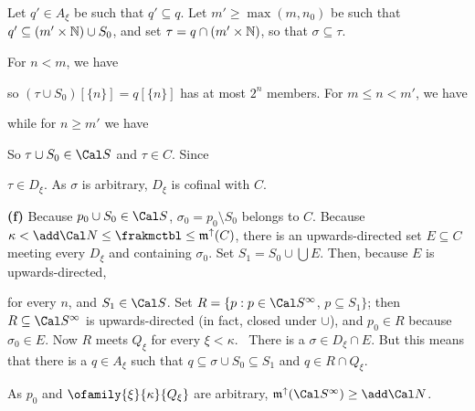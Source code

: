 {

\noindent Let $q'\in A_{\xi}$ be such that $q'\subseteq q$.   Let
$m'\ge\max(m,n_0)$ be such that $q'\subseteq(m'\times\Bbb N)\cup S_0$,
and set $\tau=q\cap(m'\times\Bbb N)$, so that $\sigma\subseteq\tau$.

For $n<m$, we have


\noindent so $(\tau\cup S_0)[\{n\}]=q[\{n\}]$ has at most $2^n$ members.
For $m\le n<m'$, we have


\noindent while for $n\ge m'$ we have


\noindent So $\tau\cup S_0\in\Cal S$ and $\tau\in C$.   Since


\noindent $\tau\in D_{\xi}$.   As $\sigma$ is arbitrary, $D_{\xi}$ is
cofinal with $C$.\ \Qed

\medskip

{\bf (f)} Because $p_0\cup S_0\in\Cal S$,
$\sigma_0=p_0\setminus S_0$ belongs to $C$.
Because $\kappa<\add\Cal N\le\frakmctbl\le\frak m^{\uparrow}(C)$, there
is an upwards-directed set $E\subseteq C$ meeting every $D_{\xi}$ and
containing $\sigma_0$.   Set $S_1=S_0\cup\bigcup E$.   Then, because $E$
is upwards-directed,


\noindent for every $n$, and $S_1\in\Cal S$.   Set
$R=\{p:p\in\Cal S^{\infty}$, $p\subseteq S_1\}$;  then
$R\subseteq\Cal S^{\infty}$ is
upwards-directed (in fact, closed under $\cup$), and $p_0\in R$ because
$\sigma_0\in E$.   Now $R$ meets $Q_{\xi}$ for every $\xi<\kappa$.
\Prf\ There is a
$\sigma\in D_{\xi}\cap E$.   But this means that there is a
$q\in A_{\xi}$ such that
$q\subseteq\sigma\cup S_0\subseteq S_1$ and $q\in R\cap Q_{\xi}$.\ \Qed

As $p_0$ and $\ofamily{\xi}{\kappa}{Q_{\xi}}$ are arbitrary,
$\frak m^{\uparrow}(\Cal S^{\infty})\ge\add\Cal N$.
}%

